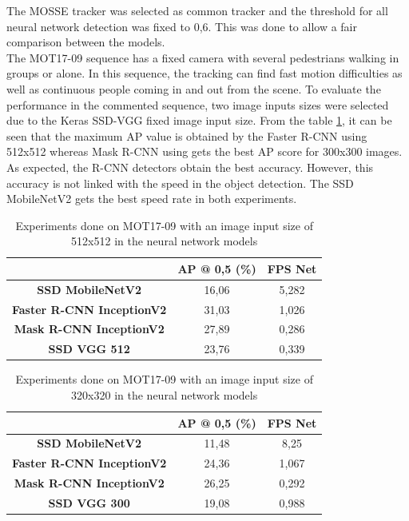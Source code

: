 The MOSSE tracker was selected as common tracker and the threshold for all neural network detection was fixed to 0,6. This was done to allow a fair comparison between the models.\\
The MOT17-09 sequence has a fixed camera with several pedestrians walking in groups or alone. In this sequence, the tracking can find fast motion difficulties as well as continuous people coming in and out from the scene. To evaluate the performance in the commented sequence, two image inputs sizes were selected due to the Keras SSD-VGG fixed image input size. From the table \ref{tab:net_exp_1}, it can be seen that the maximum AP value is obtained by the Faster R-CNN using 512x512 whereas Mask R-CNN using gets the best AP score for 300x300 images. As expected, the R-CNN detectors obtain the best accuracy. However, this accuracy is not linked with the speed in the object detection. The SSD MobileNetV2 gets the best speed rate in both experiments.\\
\begin{table}[H]
\scriptsize
\begin{center}
\begin{tabular}{|c|c|c|}
\hline
\textbf{}                         & \textbf{AP @ 0,5 (\%)} & \textbf{FPS Net} \\ \hline
\textbf{SSD MobileNetV2}          & 16,06                  & 5,282            \\ \hline
\textbf{Faster R-CNN InceptionV2} & 31,03                  & 1,026            \\ \hline
\textbf{Mask R-CNN InceptionV2}   & 27,89                  & 0,286            \\ \hline
\textbf{SSD VGG 512}              & 23,76                  & 0,339            \\ \hline
\end{tabular}
\end{center}
\caption{Experiments done on MOT17-09 with an image input size of 512x512 in the neural network models}
\label{tab:net_exp_1}
\end{table}
\begin{table}[H]
\scriptsize
\begin{center}
\begin{tabular}{|c|c|c|}
\hline
\textbf{}                         & \textbf{AP @ 0,5 (\%)} & \textbf{FPS Net} \\ \hline
\textbf{SSD MobileNetV2}          & 11,48                  & 8,25             \\ \hline
\textbf{Faster R-CNN InceptionV2} & 24,36                  & 1,067            \\ \hline
\textbf{Mask R-CNN InceptionV2}   & 26,25                  & 0,292            \\ \hline
\textbf{SSD VGG 300}              & 19,08                  & 0,988            \\ \hline
\end{tabular}
\end{center}
\caption{Experiments done on MOT17-09 with an image input size of 320x320 in the neural network models}
\label{tab:net_exp_2}
\end{table}
